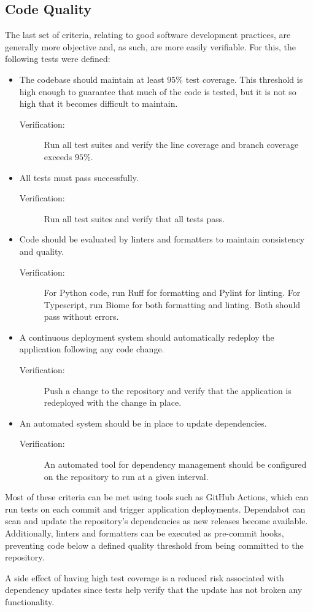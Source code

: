 \subsection{Code Quality}
The last set of criteria, relating to good software development practices, are generally more objective and, as such, are more easily verifiable. For this, the following tests were defined:
\begin{itemize}
    \item The codebase should maintain at least $95\%$ test coverage. This threshold is high enough to guarantee that much of the code is tested, but it is not so high that it becomes difficult to maintain.
    \begin{description}
        \item[Verification:] Run all test suites and verify the line coverage and branch coverage exceeds $95\%.$
    \end{description}
    \item All tests must pass successfully.
    \begin{description}
        \item[Verification:] Run all test suites and verify that all tests pass.
    \end{description}
    \item Code should be evaluated by linters and formatters to maintain consistency and quality.
    \begin{description}
        \item[Verification:] For Python code, run Ruff for formatting and Pylint for linting. For Typescript, run Biome for both formatting and linting. Both should pass without errors.
    \end{description}
    \item A continuous deployment system should automatically redeploy the application following any code change.
    \begin{description}
        \item[Verification:] Push a change to the repository and verify that the application is redeployed with the change in place.
    \end{description}
    \item An automated system should be in place to update dependencies.
    \begin{description}
        \item[Verification:] An automated tool for dependency management should be configured on the repository to run at a given interval.
    \end{description}
\end{itemize}

Most of these criteria can be met using tools such as GitHub Actions, which can run tests on each commit and trigger application deployments. Dependabot can scan and update the repository’s dependencies as new releases become available. Additionally, linters and formatters can be executed as pre-commit hooks, preventing code below a defined quality threshold from being committed to the repository.

A side effect of having high test coverage is a reduced risk associated with dependency updates since tests help verify that the update has not broken any functionality.
